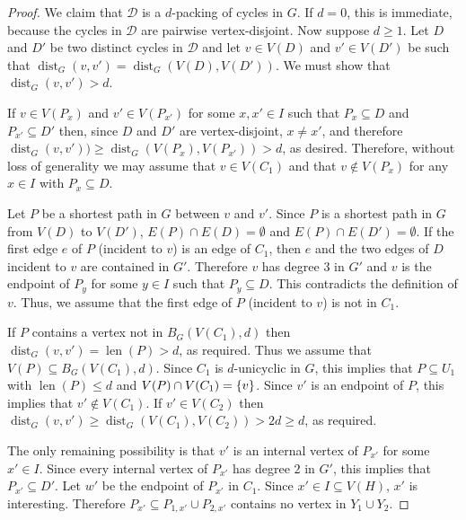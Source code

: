 \documentclass{patmorin}
\DeclareMathOperator{\len}{len}
\DeclareMathOperator{\dist}{dist}
\DeclarePairedDelimiter\set{\{}{\}}
\begin{document}
\begin{proof}
    We claim that $\mathcal{D}$ is a $d$-packing of cycles in $G$. If $d=0$, this is immediate, because the cycles in $\mathcal{D}$ are pairwise vertex-disjoint.  Now suppose $d\ge 1$.
    Let $D$ and $D'$ be two distinct cycles in $\mathcal{D}$ and let $v\in V(D)$ and $v'\in V(D')$ be such that $\dist_G(v,v')=\dist_G(V(D),V(D'))$.  We must show that $\dist_G(v,v')>d$.


    If $v\in V(P_x)$ and $v'\in V(P_{x'})$ for some  $x,x' \in I$ such that $P_x\subseteq D$ and $P_{x'}\subseteq D'$ then,
    since $D$ and $D'$ are vertex-disjoint, $x\neq x'$, and therefore
    $\dist_G(v,v'))\ge  \dist_G(V(P_x),V(P_{x'}))>d$, as desired.  Therefore, without loss of generality we may assume that $v\in V(C_1)$ and that $v\notin V(P_x)$ for any $x\in I$ with $P_x\subseteq D$.

    Let $P$ be a shortest path in $G$ between $v$ and $v'$.  Since $P$ is a shortest path in $G$ from $V(D)$ to $V(D')$, $E(P)\cap E(D)=\emptyset$ and $E(P)\cap E(D')=\emptyset$.  If the first edge $e$ of $P$ (incident to $v$) is an edge of $C_1$, then $e$ and the two edges of $D$ incident to $v$ are contained in $G'$. Therefore $v$ has degree $3$ in $G'$ and $v$ is the endpoint of $P_y$ for some $y\in I$ such that $P_y\subseteq D$.  This contradicts the definition of $v$.
    Thus, we assume that the first edge of $P$ (incident to $v$) is not in $C_1$.

    If $P$ contains a vertex not in $B_G(V(C_1),d)$ then $\dist_G(v,v')=\len(P)>d$, as required.  Thus we assume that $V(P)\subseteq B_G(V(C_1),d)$.
    Since $C_1$ is $d$-unicyclic in $G$, this implies that $P\subseteq U_1$ with $\len(P)\leq d$ and $V(P)\cap V(C_1)=\set{v}$.
    Since $v'$ is an endpoint of $P$, this implies that $v'\notin V(C_1)$.  If $v'\in V(C_2)$ then $\dist_G(v,v')\ge \dist_G(V(C_1),V(C_2))>2d\geq d$, as required.

    The only remaining possibility is that $v'$ is an internal vertex of $P_{x'}$ for some $x'\in I$.  Since every internal vertex of $P_{x'}$ has degree $2$ in $G'$, this implies that  $P_{x'}\subseteq D'$.
    Let $w'$ be the endpoint of $P_{x'}$ in $C_1$. Since $x'\in I\subseteq V(H)$, $x'$ is interesting.
    Therefore $P_{x'}\subseteq P_{1,x'}\cup P_{2,x'}$ contains no vertex in $Y_1\cup Y_2$.


\end{proof}
\end{document}
